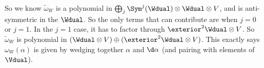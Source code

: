 So we know $\tilde{\omega}_W$ is a polynomial in $\bigoplus_j \Sym^j(\Wdual) \otimes \Wdual \otimes V$, and is anti-symmetric in the $\Wdual$. So the only terms that can contribute are when $j = 0$ or $j = 1$. In the $j = 1$ case, it has to factor through $\exterior^2 \Wdual \otimes V$. So $\tilde{\omega}_W$ is polynomial in $(\Wdual \otimes V) \oplus (\exterior^2 \Wdual \otimes V)$. This exactly says $\omega_W(\alpha)$ is given by wedging together $\alpha$ and $\d \alpha$ (and pairing with elements of $\Vdual$).
